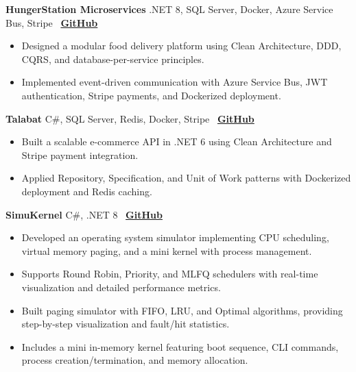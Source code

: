 \documentclass[letterpaper, 11pt]{article}
\begin{document}
\vspace{0.6em}
\textbf{HungerStation Microservices \textbar{}} .NET 8, SQL Server, Docker, Azure Service Bus, Stripe
\hfill \faGithub~\textbf{\href{https://github.com/Mo7ammedd/HungerStation_Microservices}{GitHub}} \\
\vspace{-0.6em}
\begin{itemize}[leftmargin=1.5em, nosep, itemsep=0.15em]
    \item Designed a modular food delivery platform using Clean Architecture, DDD, CQRS, and database-per-service principles.
    \item Implemented event-driven communication with Azure Service Bus, JWT authentication, Stripe payments, and Dockerized deployment.
\end{itemize}

\vspace{0.6em}
\textbf{Talabat \textbar{}} C\#, SQL Server, Redis, Docker, Stripe
\hfill \faGithub~\textbf{\href{https://github.com/Mo7ammedd/Talabat-APIs}{GitHub}} \\
\vspace{-0.6em}
\begin{itemize}[leftmargin=1.5em, nosep, itemsep=0.15em]
    \item Built a scalable e-commerce API in .NET 6 using Clean Architecture and Stripe payment integration.
    \item Applied Repository, Specification, and Unit of Work patterns with Dockerized deployment and Redis caching.
\end{itemize}


\vspace{0.6em}
\textbf{SimuKernel \textbar{}} C\#, .NET 8
\hfill \faGithub~\textbf{\href{https://github.com/Mo7ammedd/SimuKernel}{GitHub}} \\
\vspace{-0.6em}
\begin{itemize}[leftmargin=1.5em, nosep, itemsep=0.15em]
    \item Developed an operating system simulator implementing CPU scheduling, virtual memory paging, and a mini kernel with process management.
    \item Supports Round Robin, Priority, and MLFQ schedulers with real-time visualization and detailed performance metrics.
    \item Built paging simulator with FIFO, LRU, and Optimal algorithms, providing step-by-step visualization and fault/hit statistics.
    \item Includes a mini in-memory kernel featuring boot sequence, CLI commands, process creation/termination, and memory allocation.
\end{itemize}
\end{document}
